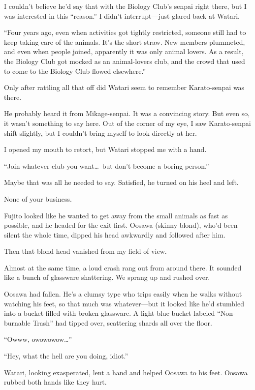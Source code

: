 \documentclass[
    a4paper,
    12pt,
    twoside,
    openany,
    UTF8,
    fontset=windows
]{ctexbook}
\begin{document}
I couldn't believe he'd say that with the Biology Club's senpai right there, but I was interested in this ``reason.'' I didn't interrupt---just glared back at Watari.

``Four years ago, even when activities got tightly restricted, someone still had to keep taking care of the animals. It's the short straw. New members plummeted, and even when people joined, apparently it was only animal lovers. As a result, the Biology Club got mocked as an animal-lovers club, and the crowd that used to come to the Biology Club flowed elsewhere.''

Only after rattling all that off did Watari seem to remember Karato-senpai was there.

He probably heard it from Mikage-senpai. It was a convincing story. But even so, it wasn't something to say here. Out of the corner of my eye, I saw Karato-senpai shift slightly, but I couldn't bring myself to look directly at her.

I opened my mouth to retort, but Watari stopped me with a hand.

``Join whatever club you want\dots\ but don't become a boring person.''

Maybe that was all he needed to say. Satisfied, he turned on his heel and left.

None of your business.

Fujito looked like he wanted to get away from the small animals as fast as possible, and he headed for the exit first. Oosawa (skinny blond), who'd been silent the whole time, dipped his head awkwardly and followed after him.

Then that blond head vanished from my field of view.

Almost at the same time, a loud crash rang out from around there. It sounded like a bunch of glassware shattering. We sprang up and rushed over.

Oosawa had fallen. He's a clumsy type who trips easily when he walks without watching his feet, so that much was whatever---but it looked like he'd stumbled into a bucket filled with broken glassware. A light-blue bucket labeled ``Non-burnable Trash'' had tipped over, scattering shards all over the floor.

``Owww, owowowow\dots''

``Hey, what the hell are you doing, idiot.''

Watari, looking exasperated, lent a hand and helped Oosawa to his feet. Oosawa rubbed both hands like they hurt.
\end{document}
